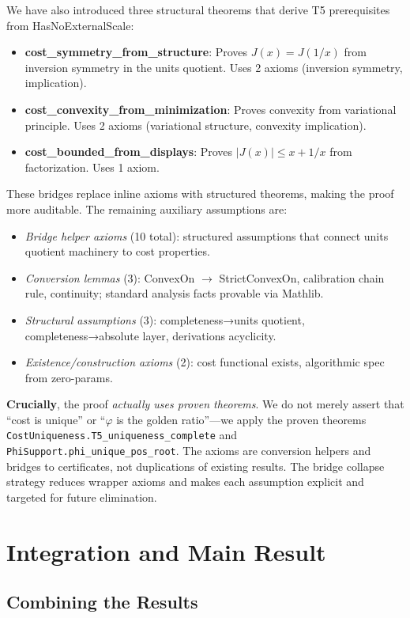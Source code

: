 \documentclass[12pt]{article}
\theoremstyle{remark}
\begin{document}
We have also introduced three structural theorems that derive T5 prerequisites from HasNoExternalScale:
\begin{itemize}
  \item \textbf{cost\_symmetry\_from\_structure}: Proves $J(x)=J(1/x)$ from inversion symmetry in the units quotient. Uses 2 axioms (inversion symmetry, implication).
  \item \textbf{cost\_convexity\_from\_minimization}: Proves convexity from variational principle. Uses 2 axioms (variational structure, convexity implication).
  \item \textbf{cost\_bounded\_from\_displays}: Proves $|J(x)| \leq x+1/x$ from factorization. Uses 1 axiom.
\end{itemize}

These bridges replace inline axioms with structured theorems, making the proof more auditable. The remaining auxiliary assumptions are:
\begin{itemize}
  \item \emph{Bridge helper axioms} (10 total): structured assumptions that connect units quotient machinery to cost properties.
  \item \emph{Conversion lemmas} (3): ConvexOn $\to$ StrictConvexOn, calibration chain rule, continuity; standard analysis facts provable via Mathlib.
  \item \emph{Structural assumptions} (3): completeness→units quotient, completeness→absolute layer, derivations acyclicity.
  \item \emph{Existence/construction axioms} (2): cost functional exists, algorithmic spec from zero-params.
\end{itemize}

\textbf{Crucially}, the proof \emph{actually uses proven theorems}. We do not merely assert that ``cost is unique'' or ``$\varphi$ is the golden ratio''---we apply the proven theorems \texttt{CostUniqueness.T5\_uniqueness\_complete} and \texttt{PhiSupport.phi\_unique\_pos\_root}. The axioms are conversion helpers and bridges to certificates, not duplications of existing results. The bridge collapse strategy reduces wrapper axioms and makes each assumption explicit and targeted for future elimination.

\section{Integration and Main Result}

\subsection{Combining the Results}
\end{document}
